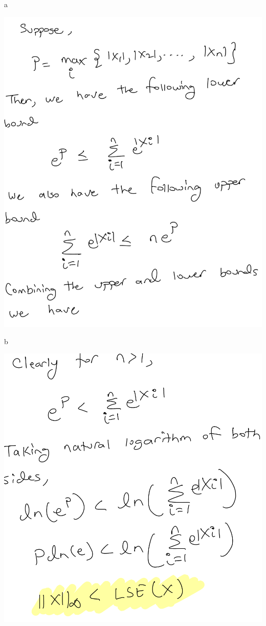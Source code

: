 \documentclass{article}
\renewcommand{\bf}[1]{\textbf{{#1}}}
\newcommand{\ul}[1]{\underline{{#1}}}
\newcommand{\tbu}{\bf{\ul{}}}
\begin{document}
\begin{minipage}{2.6in}
\tbu{a}

\includegraphics[scale=0.22]{mr6a1.png}

\tbu{b}

\includegraphics[scale=0.22]{mr6b.png}

\end{minipage}
\end{document}
